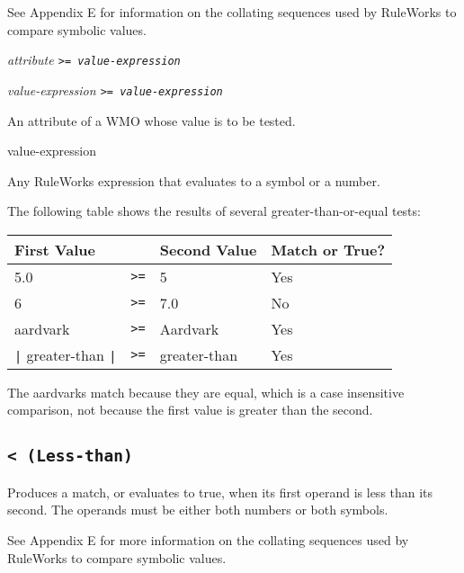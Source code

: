See Appendix E for information on the collating sequences used by
RuleWorks to compare symbolic values.

\Format

\ct\it{attribute} \tt{>=} \it{value-expression}

\it{value-expression} \tt{>=} \it{value-expression}

\begin{operands}

\item[\ct{attribute}]

  An attribute of a WMO whose value is to be tested.

\item[value-expression]

  Any RuleWorks expression that evaluates to a symbol or a number.
\end{operands}

\Example

The following table shows the results of several greater-than-or-equal
tests:

\begin{center}
\begin{tabular}{lcll}
  \toprule
  First Value      &    & Second Value & Match or True? \\    
  \midrule
  5.0              & \verb|>=| & 5            & Yes            \\
  6                & \verb|>=| & 7.0          & No             \\
  aardvark         & \verb|>=| & Aardvark     & Yes            \\
  \verb,|, greater-than \verb,|, & \verb|>=| & greater-than & Yes            \\
  \bottomrule
\end{tabular}
\end{center}

The aardvarks match because they are equal, which is a case
insensitive comparison, not because the first value is greater than
the second.

\subsection{\tt< (Less-than)}

Produces a match, or evaluates to true, when its first operand is less
than its second. The operands must be either both numbers or both
symbols.

See Appendix E for more information on the collating sequences used by
RuleWorks to compare symbolic values.

